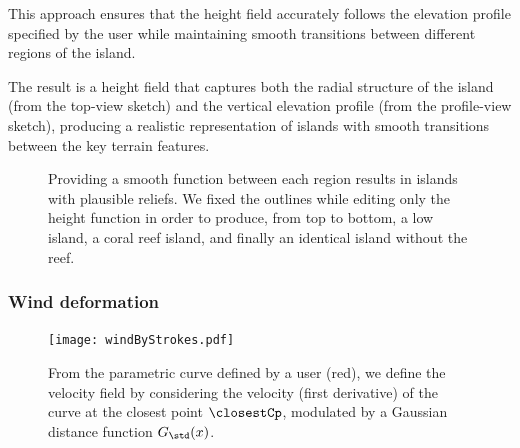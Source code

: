 This approach ensures that the height field accurately follows the elevation profile specified by the user while maintaining smooth transitions between different regions of the island.


The result is a height field that captures both the radial structure of the island (from the top-view sketch) and the vertical elevation profile (from the profile-view sketch), producing a realistic representation of islands with smooth transitions between the key terrain features.

\begin{figure}[H]
\caption{Providing a smooth function between each region results in islands with plausible reliefs. We fixed the outlines while editing only the height function in order to produce, from top to bottom, a low island, a coral reef island, and finally an identical island without the reef.}
\label{fig:coral-island-procedural-smooth-heights}
\end{figure}

\subsubsection{Wind deformation}
\label{sec:coral-island-wind-deformation}

\begin{figure}[H]
\centering
\texttt{[image: windByStrokes.pdf]}
\caption{From the parametric curve defined by a user (red), we define the velocity field by considering the velocity (first derivative) of the curve at the closest point $\closestCp$, modulated by a Gaussian distance function $G_{\std}(x)$.}
\label{fig:coral-island-wind-from-strokes}
\end{figure}

